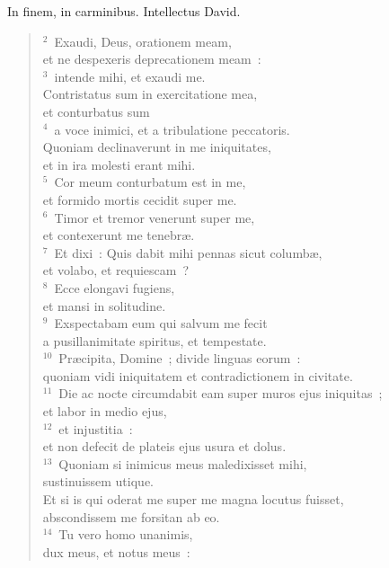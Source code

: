 \lettrine[lines=3,image=true,loversize=0.05,lraise=-0.03]{I}{}n finem, in carminibus. Intellectus David.
\begin{flushleft}\begin{verse}\vspace{6pt}${}^{2}$~Exaudi, Deus, orationem meam,\\ et ne despexeris deprecationem meam~:\\
${}^{3}$~intende mihi, et exaudi me.\\ Contristatus sum in exercitatione mea,\\ et conturbatus sum\\
${}^{4}$~a voce inimici, et a tribulatione peccatoris.\\ Quoniam declinaverunt in me iniquitates,\\ et in ira molesti erant mihi.\\
${}^{5}$~Cor meum conturbatum est in me,\\ et formido mortis cecidit super me.\\
${}^{6}$~Timor et tremor venerunt super me,\\ et contexerunt me tenebr\ae .\\
${}^{7}$~Et dixi~: Quis dabit mihi pennas sicut columb\ae ,\\ et volabo, et requiescam~?\\
${}^{8}$~Ecce elongavi fugiens,\\ et mansi in solitudine.\\
${}^{9}$~Exspectabam eum qui salvum me fecit\\ a pusillanimitate spiritus, et tempestate.\\
${}^{10}$~Pr\ae cipita, Domine~; divide linguas eorum~:\\ quoniam vidi iniquitatem et contradictionem in civitate.\\
${}^{11}$~Die ac nocte circumdabit eam super muros ejus iniquitas~;\\ et labor in medio ejus,\\
${}^{12}$~et injustitia~:\\ et non defecit de plateis ejus usura et dolus.\\
${}^{13}$~Quoniam si inimicus meus maledixisset mihi,\\ sustinuissem utique.\\ Et si is qui oderat me super me magna locutus fuisset,\\ abscondissem me forsitan ab eo.\\
${}^{14}$~Tu vero homo unanimis,\\ dux meus, et notus meus~:\\

\end{verse}
\end{flushleft}
